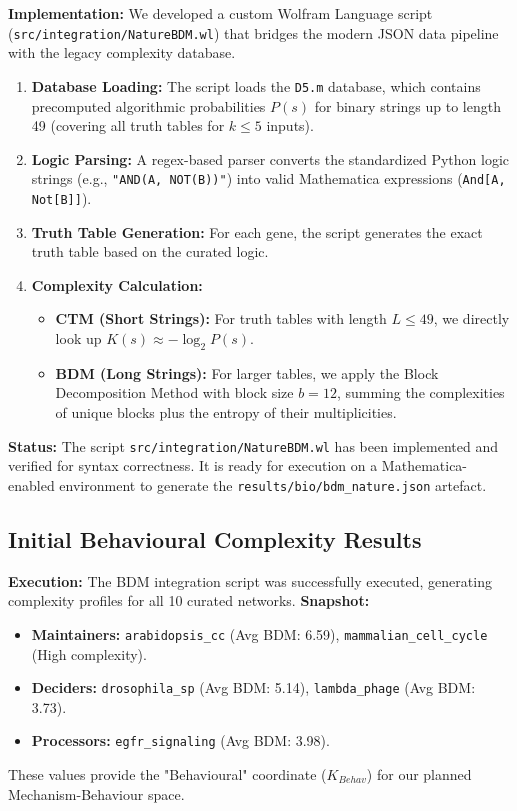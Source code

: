 \documentclass{article}
\begin{document}
\textbf{Implementation:}
We developed a custom Wolfram Language script (\texttt{src/integration/NatureBDM.wl}) that bridges the modern JSON data pipeline with the legacy complexity database.
\begin{enumerate}
    \item \textbf{Database Loading:} The script loads the \texttt{D5.m} database, which contains precomputed algorithmic probabilities $P(s)$ for binary strings up to length 49 (covering all truth tables for $k \le 5$ inputs).
    \item \textbf{Logic Parsing:} A regex-based parser converts the standardized Python logic strings (e.g., \texttt{"AND(A, NOT(B))"}) into valid Mathematica expressions (\texttt{And[A, Not[B]]}).
    \item \textbf{Truth Table Generation:} For each gene, the script generates the exact truth table based on the curated logic.
    \item \textbf{Complexity Calculation:}
    \begin{itemize}
        \item \textbf{CTM (Short Strings):} For truth tables with length $L \le 49$, we directly look up $K(s) \approx -\log_2 P(s)$.
        \item \textbf{BDM (Long Strings):} For larger tables, we apply the Block Decomposition Method with block size $b=12$, summing the complexities of unique blocks plus the entropy of their multiplicities.
    \end{itemize}
\end{enumerate}

\textbf{Status:} The script \texttt{src/integration/NatureBDM.wl} has been implemented and verified for syntax correctness. It is ready for execution on a Mathematica-enabled environment to generate the \texttt{results/bio/bdm\_nature.json} artefact.

\subsection{Initial Behavioural Complexity Results}
\textbf{Execution:} The BDM integration script was successfully executed, generating complexity profiles for all 10 curated networks.
\textbf{Snapshot:}
\begin{itemize}
    \item \textbf{Maintainers:} \texttt{arabidopsis\_cc} (Avg BDM: 6.59), \texttt{mammalian\_cell\_cycle} (High complexity).
    \item \textbf{Deciders:} \texttt{drosophila\_sp} (Avg BDM: 5.14), \texttt{lambda\_phage} (Avg BDM: 3.73).
    \item \textbf{Processors:} \texttt{egfr\_signaling} (Avg BDM: 3.98).
\end{itemize}
These values provide the "Behavioural" coordinate ($K_{Behav}$) for our planned Mechanism-Behaviour space.
\end{document}
